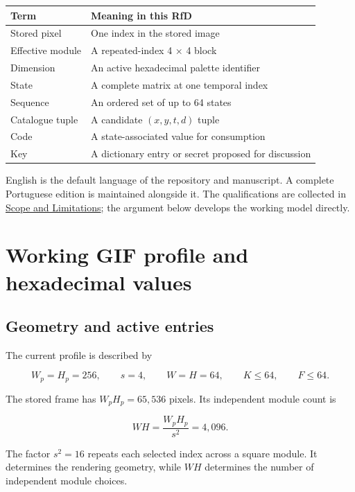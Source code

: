 \documentclass[
  11pt,
  a4paper,
]{article}
\begin{document}
\begin{longtable}[]{@{}ll@{}}
\toprule\noalign{}
Term & Meaning in this RfD \\
\midrule\noalign{}
\endhead
\bottomrule\noalign{}
\endlastfoot
Stored pixel & One index in the stored image \\
Effective module & A repeated-index 4 × 4 block \\
Dimension & An active hexadecimal palette identifier \\
State & A complete matrix at one temporal index \\
Sequence & An ordered set of up to 64 states \\
Catalogue tuple & A candidate \((x,y,t,d)\) tuple \\
Code & A state-associated value for consumption \\
Key & A dictionary entry or secret proposed for discussion \\
\end{longtable}

English is the default language of the repository and manuscript. A
complete Portuguese edition is maintained alongside it. The
qualifications are collected in
\protect\hyperlink{scope-and-limitations}{Scope and Limitations}; the
argument below develops the working model directly.

\hypertarget{working-gif-profile-and-hexadecimal-values}{%
\section{Working GIF profile and hexadecimal
values}\label{working-gif-profile-and-hexadecimal-values}}

\hypertarget{geometry-and-active-entries}{%
\subsection{Geometry and active
entries}\label{geometry-and-active-entries}}

The current profile is described by

\[
W_p=H_p=256,\qquad s=4,\qquad W=H=64,\qquad K\le64,\qquad F\le64.
\]

The stored frame has \(W_pH_p=65{,}536\) pixels. Its independent module
count is

\[
WH=\frac{W_pH_p}{s^2}=4{,}096.
\]

The factor \(s^2=16\) repeats each selected index across a square
module. It determines the rendering geometry, while \(WH\) determines
the number of independent module choices.
\end{document}
